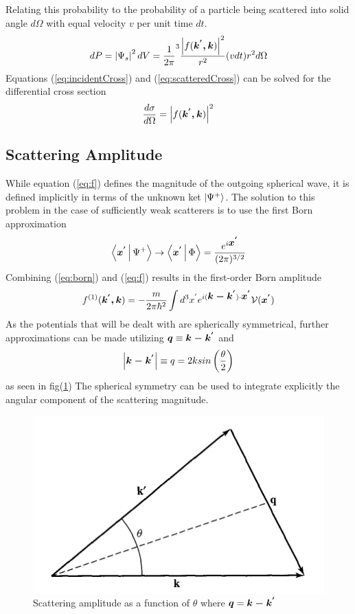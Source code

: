 Relating this probability to the probability of a particle being scattered into solid angle $d\Omega$ with equal velocity $v$ per unit time $dt$. 
\begin{equation}
\label{eq:scatteredCross}
dP=\left|\Psi_s\right|^2dV = \frac{1}{2\pi}^3 \frac{\left|f(\mbox{\boldmath$k^{'},k$})\right|^2}{r^2}(vdt)r^2 d\Omega
\end{equation}
Equations (\ref{eq:incidentCross}) and (\ref{eq:scatteredCross}) can be solved for the differential cross section 
\begin{equation}
\label{eq:differentialCrossSection}
\frac{d\sigma}{d\Omega}= \left|f(\mbox{\boldmath$k^{'},k$})\right|^2
\end{equation}

\subsection{Scattering Amplitude}
While equation (\ref{eq:f}) defines the magnitude of the outgoing spherical wave, it is defined implicitly in terms of the unknown ket $\Ket{\Psi^{+}}$. The solution to this problem in the case of sufficiently weak scatterers is to use the first Born approximation \cite{sakurai}
\begin{equation}
\label{eq:born}
\Braket{\mbox{\boldmath$x^{'}$}|\Psi^{+}} \rightarrow \Braket{\mbox{\boldmath$x^{'}$}| \Phi} = \frac{e^{i\mbox{\boldmath$x^{'}$}}}{(2\pi)^{3/2}}
\end{equation}
Combining (\ref{eq:born}) and (\ref{eq:f}) results in the first-order Born amplitude \cite{sakurai}
\begin{equation}
\label{eq:firstOrderBorn}
f^{(1)}(\mbox{\boldmath$k^{'},k$}) = -\frac{m}{2\pi\hbar^2}\int d^3x^{'}e^{i(\mbox{\boldmath$k-k^{'}$})\cdot \mbox{\boldmath$x^{'}$}}\mathcal{V}(\mbox{\boldmath$x^{'}$})
\end{equation}
As the potentials that will be dealt with are spherically symmetrical, further approximations can be made utilizing $\mbox{\boldmath$q$} \equiv \mbox{\boldmath$k-k^{'}$}$ and $$\left|\mbox{\boldmath$k-k^{'}$}\right| \equiv  q = 2ksin \left( \frac{\theta}{2}\right)$$ as seen in fig(\ref{fig:scatteringAngle}) The spherical symmetry can be used to integrate explicitly the angular component of the scattering magnitude. \cite{sakurai}
\begin{figure}[ht!]
\centering
\includegraphics[scale=0.5]{Figures/scatteringAngle.png}
\caption{Scattering amplitude as a function of $\theta$ where $\mbox{\boldmath$q$}=\mbox{\boldmath$k-k^{'}$}$ \cite{sakurai}}
\label{fig:scatteringAngle}
\end{figure}

